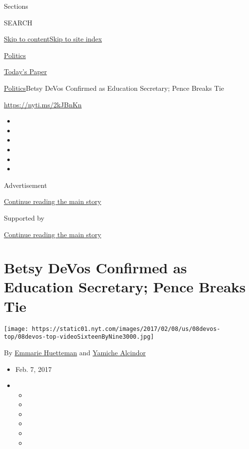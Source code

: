 Sections

SEARCH

\protect\hyperlink{site-content}{Skip to
content}\protect\hyperlink{site-index}{Skip to site index}

\href{https://www.nytimes.com/section/politics}{Politics}

\href{https://myaccount.nytimes.com/auth/login?response_type=cookie\&client_id=vi}{}

\href{https://www.nytimes.com/section/todayspaper}{Today's Paper}

\href{/section/politics}{Politics}\textbar{}Betsy DeVos Confirmed as
Education Secretary; Pence Breaks Tie

\url{https://nyti.ms/2kJBnKn}

\begin{itemize}
\item
\item
\item
\item
\item
\item
\end{itemize}

Advertisement

\protect\hyperlink{after-top}{Continue reading the main story}

Supported by

\protect\hyperlink{after-sponsor}{Continue reading the main story}

\hypertarget{betsy-devos-confirmed-as-education-secretary-pence-breaks-tie}{%
\section{Betsy DeVos Confirmed as Education Secretary; Pence Breaks
Tie}\label{betsy-devos-confirmed-as-education-secretary-pence-breaks-tie}}

\texttt{[image: https://static01.nyt.com/images/2017/02/08/us/08devos-top/08devos-top-videoSixteenByNine3000.jpg]}

By \href{https://www.nytimes.com/by/emmarie-huetteman}{Emmarie
Huetteman} and \href{http://www.nytimes.com/by/yamiche-alcindor}{Yamiche
Alcindor}

\begin{itemize}
\item
  Feb. 7, 2017
\item
  \begin{itemize}
  \item
  \item
  \item
  \item
  \item
  \item
  \end{itemize}
\end{itemize}

